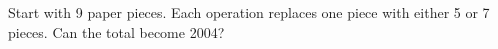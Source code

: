 Start with 9 paper pieces. Each operation replaces one piece with either 5 or 7 pieces. Can the total become 2004?

